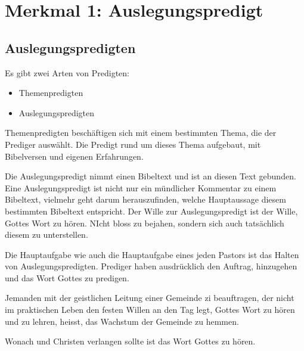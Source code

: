 \documentclass{../../inc/mybib}
\begin{document}
\section*{Merkmal 1: Auslegungspredigt}
\subsection*{Auslegungspredigten}
Es gibt zwei Arten von Predigten:
\begin{itemize}
    \item Themenpredigten
    \item Auslegungspredigten
\end{itemize}
Themenpredigten beschäftigen sich mit einem bestimmten Thema, die der Prediger auswählt. Die Predigt rund um dieses Thema aufgebaut, mit Bibelversen und eigenen Erfahrungen.

Die Auslegungspredigt nimmt einen Bibeltext und ist an diesen Text gebunden. Eine Auslegungspredigt ist nicht nur ein mündlicher Kommentar zu einem Bibeltext, vielmehr geht darum herauszufinden, welche Hauptaussage diesem bestimmten Bibeltext entspricht. Der Wille zur Auslegungspredigt ist der Wille, Gottes Wort zu hören. NIcht bloss zu bejahen, sondern sich auch tatsächlich diesem zu unterstellen.

Die Hauptaufgabe wie auch die Hauptaufgabe eines jeden Pastors ist das Halten von Auslegungspredigten. Prediger haben ausdrücklich den Auftrag, hinzugehen und das Wort Gottes zu predigen.

Jemanden mit der geistlichen Leitung einer Gemeinde zi beauftragen, der nicht im praktischen Leben den festen Willen an den Tag legt, Gottes Wort zu hören und zu lehren, heisst, das Wachstum der Gemeinde zu hemmen.

Wonach und Christen verlangen sollte ist das Wort Gottes zu hören.
\end{document}
